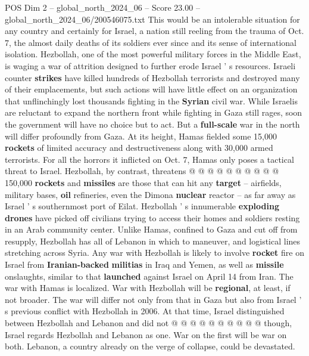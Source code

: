 \begin{textsample}{POS Dim 2 – global\_north\_2024\_06 – Score 23.00 – global\_north\_2024\_06/200546075.txt}  \label{ex:f2_pos_314}
This would be an intolerable situation for any country and certainly for Israel, a nation still reeling from the trauma of Oct. 7, the almost daily deaths of its soldiers ever since and its sense of international isolation.
Hezbollah, one of the most powerful military forces in the Middle East, is waging a war of attrition designed to further erode Israel ' s resources.
Israeli counter \textbf{strikes} have killed hundreds of Hezbollah terrorists and destroyed many of their emplacements, but such actions will have little effect on an organization that unflinchingly lost thousands fighting in the \textbf{Syrian} civil war.
While Israelis are reluctant to expand the northern front while fighting in Gaza still rages, soon the government will have no choice but to act.
But a \textbf{full-scale} war in the north will differ profoundly from Gaza.
At its height, Hamas fielded some 15,000 \textbf{rockets} of limited accuracy and destructiveness along with 30,000 armed terrorists.
For all the horrors it inflicted on Oct. 7, Hamas only poses a tactical threat to Israel.
Hezbollah, by contrast, threatens @ @ @ @ @ @ @ @ @ @ 150,000 \textbf{rockets} and \textbf{missiles} are those that can hit any \textbf{target} -- airfields, military bases, \textbf{oil} refineries, even the Dimona \textbf{nuclear} reactor -- as far away as Israel ' s southernmost port of Eilat.
Hezbollah ' s innumerable \textbf{exploding} \textbf{drones} have picked off civilians trying to access their homes and soldiers resting in an Arab community center.
Unlike Hamas, confined to Gaza and cut off from resupply, Hezbollah has all of Lebanon in which to maneuver, and logistical lines stretching across Syria.
Any war with Hezbollah is likely to involve \textbf{rocket} fire on Israel from \textbf{Iranian-backed} \textbf{militias} in Iraq and Yemen, as well as \textbf{missile} onslaughts, similar to that \textbf{launched} against Israel on April 14 from Iran.
The war with Hamas is localized.
War with Hezbollah will be \textbf{regional}, at least, if not broader.
The war will differ not only from that in Gaza but also from Israel ' s previous conflict with Hezbollah in 2006.
At that time, Israel distinguished between Hezbollah and Lebanon and did not @ @ @ @ @ @ @ @ @ @ though, Israel regards Hezbollah and Lebanon as one.
War on the first will be war on both.
Lebanon, a country already on the verge of collapse, could be devastated.

\end{textsample}
